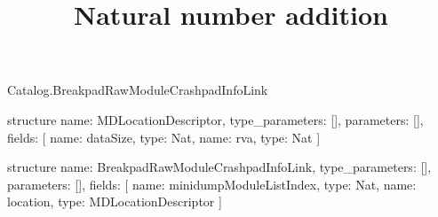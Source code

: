 \begin{lexlean}{Catalog.BreakpadRawModuleCrashpadInfoLink}
\title{Natural number addition}
\begin{semanticmodule}
structure{
  name: MDLocationDescriptor,
  type_parameters: [],
  parameters: [],
  fields: [
    {name: dataSize, type: Nat},
    {name: rva, type: Nat}
  ]
}

structure{
  name: BreakpadRawModuleCrashpadInfoLink,
  type_parameters: [],
  parameters: [],
  fields: [
    {name: minidumpModuleListIndex, type: Nat},
    {name: location, type: MDLocationDescriptor}
  ]
}
\end{semanticmodule}
\end{lexlean}

